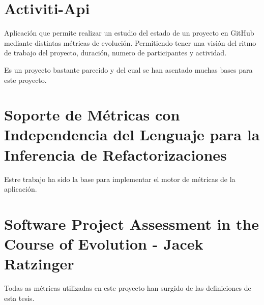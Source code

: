 
\section{Activiti-Api}\cite{rlp0019_software_2019}
Aplicación que permite realizar un estudio del estado de un proyecto en GitHub mediante distintas métricas de evolución. Permitiendo tener una visión del ritmo de trabajo del proyecto, duración, numero de participantes y actividad.

Es un proyecto bastante parecido y del cual se han asentado muchas bases para este proyecto.
\section{Soporte de Métricas con Independencia del Lenguaje para la Inferencia de Refactorizaciones}\cite{rlp0019_software_2019}
Estre trabajo ha sido la base para implementar el motor de métricas de la aplicación.
\section{Software Project Assessment in the Course of Evolution -  Jacek Ratzinger}\cite{rlp0019_software_2019}
Todas as métricas utilizadas en este proyecto han surgido de las definiciones de esta tesis.